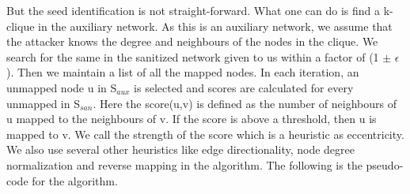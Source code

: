 \documentclass[preprint,12pt]{elsarticle}
\theoremstyle{definition}
\theoremstyle{remark}
\begin{document}
But the seed identification is not straight-forward. What one can do is find a k-clique in the auxiliary network. As this is an auxiliary network, we assume that the attacker knows the degree and neighbours of the nodes in the clique. We search for the same in the sanitized network given to us within a factor of (1 $\pm$ $\epsilon$). Then we maintain a list of all the mapped nodes. In each iteration, an unmapped node u in S$_{aux}$ is selected and scores are calculated for every unmapped in S$_{san}$. Here the score(u,v) is defined as the number of neighbours of u mapped to the neighbours of v. If the score is above a threshold, then u is mapped to v. We call the strength of the score which is a heuristic as eccentricity. We also use several other heuristics like edge directionality, node degree normalization and reverse mapping in the algorithm. The following is the pseudo-code for the algorithm.
\end{document}
